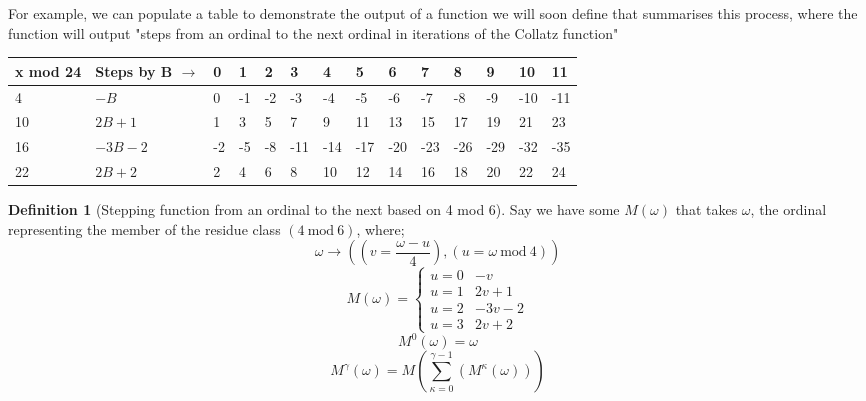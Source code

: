 \documentclass[12pt,a4paper]{amsart}
\numberwithin{equation}{section}
\theoremstyle{plain}
\theoremstyle{definition}
\newtheorem{Def}[Th]{Definition}
\begin{document}
For example, we can populate a table to demonstrate the output of a function we will soon define that summarises this process, where the function will output "steps from an ordinal to the next ordinal in iterations of the Collatz function"

\begin{table}
\begin{tabular}{|l|l|l|l|l|l|l|l|l|l|l|l|l|l|}
\hline
x mod 24 & Steps by B $\rightarrow$ & 0 & 1 & 2 & 3 & 4 & 5 & 6 & 7 & 8 & 9 & 10 & 11 \\ \hline
4 & $-B$ & 0 & -1 & -2 & -3 & -4 & -5 & -6 & -7 & -8 & -9 & -10 & -11 \\ \hline
10 & $2B+1$ &  1  & 3  & 5  & 7 & 9 & 11 & 13 & 15 & 17 & 19 & 21 & 23  \\ \hline
16 & $-3B-2$ &  -2 & -5 & -8 & -11 & -14 & -17 & -20 & -23 & -26 & -29 & -32 & -35 \\ \hline
22 & $2B+2$ &  2  & 4  & 6  & 8 & 10 & 12 & 14 & 16 & 18 & 20 & 22 & 24 \\ \hline
\end{tabular}
\end{table}

\begin{Def}[Stepping function from an ordinal to the next based on 4 mod 6]
Say we have some $M\left ( \omega \right )$ that takes $\omega$, the ordinal representing the member of the residue class $\left ( 4\:\mathrm{mod}\:6 \right )$, where;
\begin{equation}
\omega \rightarrow \left ( \left ( v = \frac{\omega - u}{4} \right ), \left ( u = \omega\:\mathrm{mod}\:4 \right ) \right )
\end{equation}
\begin{equation}
M\left ( \omega \right ) = \left \{ \begin{matrix}
u=0 & -v \\ 
u=1 & 2v+1 \\ 
u=2 & -3v-2 \\ 
u=3 & 2v+2
\end{matrix} \right.
\end{equation}
\begin{equation}
M^{0}\left( \omega \right ) = \omega
\end{equation}
\begin{equation}
M^{\gamma} \left ( \omega \right ) = M\left ( \sum_{\kappa=0}^{\gamma-1} \left ( M^{\kappa} \left ( \omega \right ) \right ) \right )
\end{equation}
\end{Def}
\end{document}
